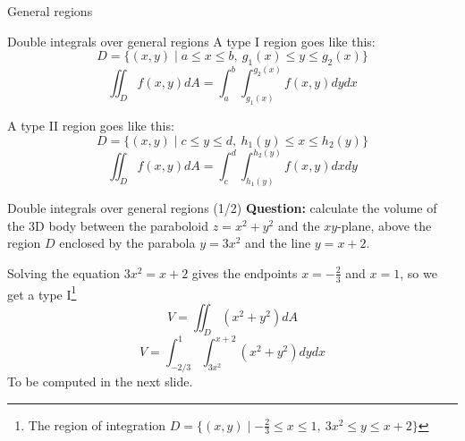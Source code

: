 \begin{frame}{General regions}

    \begin{theorybox}{Double integrals over general regions}
    A type I region goes like this:
    \[D=\{(x,y)\mid a\leq x\leq b,~ g_1(x)\leq y\leq g_2(x)\}\]
        \[\iint_D f(x,y)dA=\int_a^b\int_{g_1(x)}^{g_2(x)}f(x,y)dydx\]

    A type II region goes like this:
    \[D=\{(x,y)\mid c\leq y\leq d,~ h_1(y)\leq x\leq h_2(y)\}\]
        \[\iint_D f(x,y)dA=\int_c^d\int_{h_1(y)}^{h_2(y)}f(x,y)dxdy\]
    \end{theorybox}
\end{frame}

\begin{frame}{Double integrals over general regions (1/2)}
         \textbf{Question:} calculate the volume of the 3D body between the paraboloid $z=x^2+y^2$ and the $xy$-plane, above the region $D$ enclosed by the parabola $y=3x^2$ and the line $y=x+2$.

            \begin{minipage}{0.38\textwidth}
            \end{minipage}\hspace{1.5cm}
            \begin{minipage}{0.47\textwidth}

                Solving the equation $3x^2=x+2$ gives the endpoints $x=-\frac{2}{3}$ and $x=1$, so we get a type I\footnote{The region of integration $D=\{(x,y)\mid-\frac{2}{3}\leq x\leq1,~3x^2\leq y\leq x+2\}$} \vspace{-2mm}\[V=\iint_{D}(x^2+y^2)dA\]\vspace{-2mm}\[\boxed{V=\int_{-2/3}^{1}\int_{3x^2}^{x+2}(x^2+y^2)dydx}\]
To be computed in the next slide.
            \end{minipage}

\end{frame}

